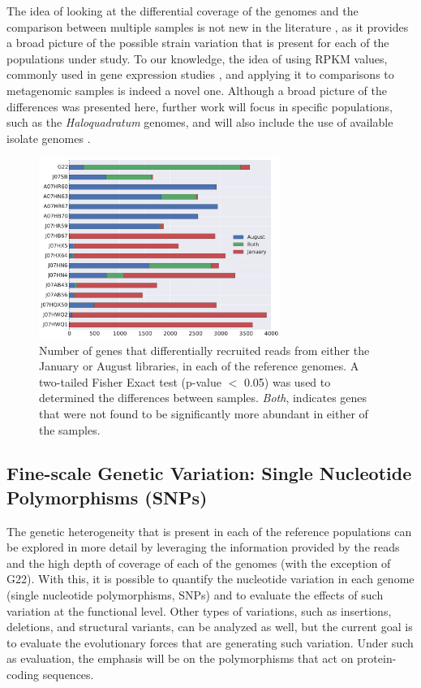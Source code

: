 The idea of looking at the differential coverage of the genomes and the  comparison between multiple samples is not new in the literature \cite{DyallSmith:2011tu,Pasic:2009bo}, as it provides a broad picture of the possible strain variation that is present for each of the populations under study. To our knowledge, the idea of using RPKM values, commonly used in gene expression studies \cite{Mortazavi:2008jj}, and applying it to comparisons to metagenomic samples is indeed a novel one. Although a broad picture of the differences was presented here, further work will focus in specific populations, such as the \textit{Haloquadratum} genomes, and will also include the use of available isolate genomes \cite{DyallSmith:2011tu}.

\begin{figure}[!hbtp]
  \centering
  \includegraphics[width=0.7\textwidth]{Chapter5/Figures/GeneDifferencesSeason.pdf}
  \caption{Number of genes that differentially recruited reads from either the January or August libraries, in each of the reference genomes. A two-tailed Fisher Exact test (p-value $<$ 0.05) was used to determined the differences between samples. \textit{Both}, indicates genes that were not found to be significantly more abundant in either of the samples.} 
  \label{CoverageGenes}
\end{figure}

\clearpage
\subsection{Fine-scale Genetic Variation: Single Nucleotide Polymorphisms (SNPs)}

The genetic heterogeneity that is present in each of the reference populations can be explored in more detail by leveraging the information provided by the reads and the high depth of coverage of each of the genomes (with the exception of G22). With this, it is possible to quantify the nucleotide variation in each genome (single nucleotide polymorphisms, SNPs) and to evaluate the effects of such variation at the functional level. Other types of variations, such as insertions, deletions, and structural variants, can be analyzed as well, but the current goal is to evaluate the evolutionary forces that are generating such variation. Under such as evaluation, the emphasis will be on the polymorphisms that act on protein-coding sequences.

